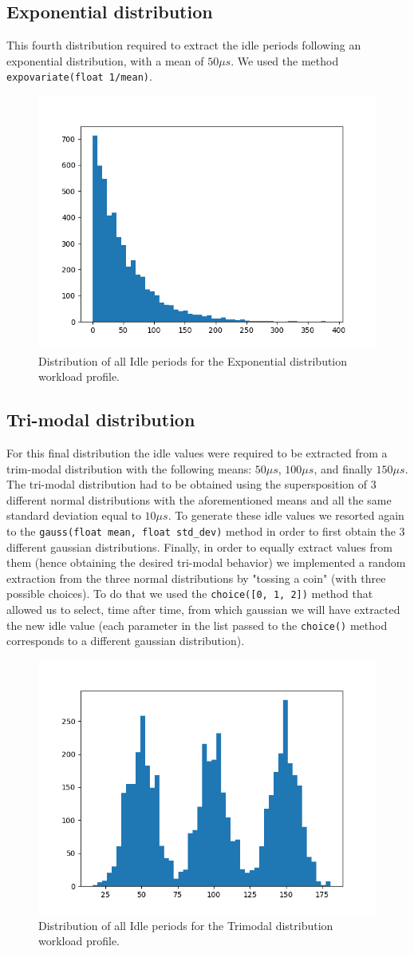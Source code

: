 \documentclass[a4paper]{article}
\begin{document}
    \subsection{Exponential distribution}
        This fourth distribution required to extract the idle periods following an exponential distribution, with a mean of $50 \mu s$. We used the method \texttt{expovariate(float 1/mean)}.
        \begin{figure}[htp]
            \centering
            \includegraphics[width=0.3 \columnwidth]{./screenshots/Idle4.png}
            \caption{
                    \label{fig:Active}
                    Distribution of all Idle periods for the Exponential distribution workload profile.
            }
        \end{figure}
    \subsection{Tri-modal distribution}
        For this final distribution the idle values were required to be extracted from a trim-modal distribution with the following means: $50 \mu s$, $100 \mu s$, and finally $150 \mu s$. The tri-modal distribution had to be obtained using the supersposition of 3 different normal distributions with the aforementioned means and all the same standard deviation equal to $10 \mu s$.
        To generate these idle values we resorted again to the \texttt{gauss(float mean, float std\_dev)} method in order to first obtain the 3 different gaussian distributions. Finally, in order to equally extract values from them (hence obtaining the desired tri-modal behavior) we implemented a random extraction from the three normal distributions by "tossing a coin" (with three possible choices). To do that we used the \texttt{choice([0, 1, 2])} method that allowed us to select, time after time, from which gaussian we will have extracted the new idle value (each parameter in the list passed to the \texttt{choice()} method corresponds to a different gaussian  distribution).
        \begin{figure}[htp]
            \centering
            \includegraphics[width=0.3 \columnwidth]{./screenshots/Idle5.png}
            \caption{
                    \label{fig:Active}
                    Distribution of all Idle periods for the Trimodal distribution workload profile.
            }
        \end{figure}
%
\end{document}
